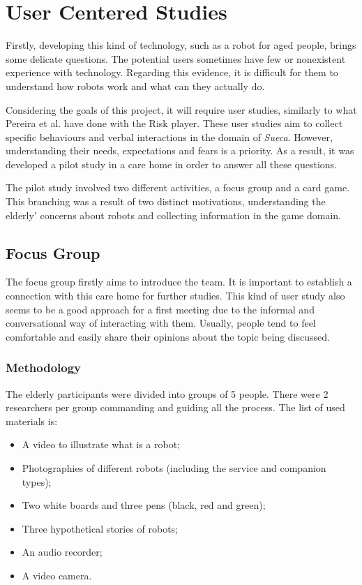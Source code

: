 \section{User Centered Studies} \label{sec:userstudies}

Firstly, developing this kind of technology, such as a robot for aged people, brings some delicate questions.
The potential users sometimes have few or nonexistent experience with technology.
Regarding this evidence, it is difficult for them to understand how robots work and what can they actually do.

Considering the goals of this project, it will require user studies, similarly to what Pereira et al. have done with the Risk player.
These user studies aim to collect specific behaviours and verbal interactions in the domain of \emph{Sueca}.
However, understanding their needs, expectations and fears is a priority. As a result, it was developed a pilot study in a care home in order to answer all these questions.

The pilot study involved two different
activities, a focus group and a card game.
This branching was a result of two distinct motivations, understanding the elderly' concerns about robots and collecting information in the game domain.





\subsection{Focus Group}
The focus group firstly aims to introduce the team.
It is important to establish a connection with this care home for further studies.
This kind of user study also seems to be a good approach for a first meeting due to the informal and conversational way of interacting with them.
Usually, people tend to feel comfortable and easily share their opinions about the topic being discussed.

\subsubsection{Methodology}
The elderly participants were divided into groups of 5 people.
There were 2 researchers per group commanding and guiding all the process.
The list of used materials is:

\begin{itemize}
\item A video to illustrate what is a robot;
\item Photographies of different robots (including the service and companion types);
\item Two white boards and three pens (black, red and green);
\item Three hypothetical stories of robots;
\item An audio recorder;
\item A video camera.
\end{itemize}

